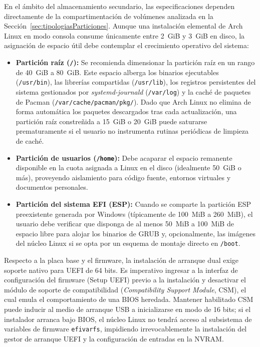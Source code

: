 \documentclass[12pt]{article}
\begin{document}
En el ámbito del almacenamiento secundario, las especificaciones dependen directamente de la compartimentación de volúmenes analizada en la Sección~\ref{sec:tipologiasParticiones}. Aunque una instalación elemental de Arch Linux en modo consola consume únicamente entre 2~GiB y 3~GiB en disco, la asignación de espacio útil debe contemplar el crecimiento operativo del sistema:
\begin{itemize}[noitemsep, topsep=2pt]
    \item \textbf{Partición raíz (\texttt{/}):} Se recomienda dimensionar la partición raíz en un rango de 40~GiB a 80~GiB. Este espacio alberga los binarios ejecutables (\texttt{/usr/bin}), las librerías compartidas (\texttt{/usr/lib}), los registros persistentes del sistema gestionados por \textit{systemd-journald} (\texttt{/var/log}) y la caché de paquetes de Pacman (\texttt{/var/\allowbreak cache/\allowbreak pacman/\allowbreak pkg/}). Dado que Arch Linux no elimina de forma automática los paquetes descargados tras cada actualización, una partición raíz constreñida a 15~GiB o 20~GiB puede saturarse prematuramente si el usuario no instrumenta rutinas periódicas de limpieza de caché.
    \item \textbf{Partición de usuarios (\texttt{/home}):} Debe acaparar el espacio remanente disponible en la cuota asignada a Linux en el disco (idealmente 50~GiB o más), proveyendo aislamiento para código fuente, entornos virtuales y documentos personales.
    \item \textbf{Partición del sistema EFI (ESP):} Cuando se comparte la partición ESP preexistente generada por Windows (típicamente de 100~MiB a 260~MiB), el usuario debe verificar que disponga de al menos 50~MiB a 100~MiB de espacio libre para alojar los binarios de GRUB y, opcionalmente, las imágenes del núcleo Linux si se opta por un esquema de montaje directo en \texttt{/boot}.
\end{itemize}

Respecto a la placa base y el firmware, la instalación de arranque dual exige soporte nativo para UEFI de 64 bits. Es imperativo ingresar a la interfaz de configuración del firmware (Setup UEFI) previo a la instalación y desactivar el módulo de soporte de compatibilidad (\textit{Compatibility Support Module}, CSM), el cual emula el comportamiento de una BIOS heredada. Mantener habilitado CSM puede inducir al medio de arranque USB a inicializarse en modo de 16 bits; si el instalador arranca bajo BIOS, el núcleo Linux no tendrá acceso al subsistema de variables de firmware \texttt{efivarfs}, impidiendo irrevocablemente la instalación del gestor de arranque UEFI y la configuración de entradas en la NVRAM.
\end{document}
